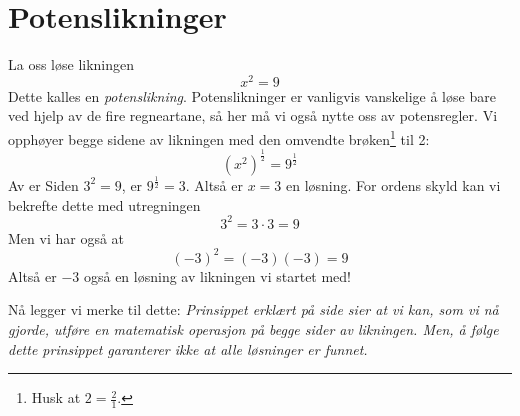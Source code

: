 \newpage
{}
\section{Potenslikninger}
La oss løse likningen
\[ x^2=9 \]
Dette kalles en \textit{potenslikning}. Potenslikninger er vanligvis vanskelige å løse bare ved hjelp av de fire regneartane, så her må vi også nytte oss av potensregler. Vi opphøyer begge sidene av likningen med den omvendte brøken\footnote{Husk at $ 2=\frac{2}{1} $.} til 2:
\[ \left(x^2\right)^\frac{1}{2}=9^\frac{1}{2} \]
Av  er
Siden $ 3^2=9 $, er $ 9^\frac{1}{2}=3 $. Altså er $ {x=3} $ en løsning. For ordens skyld kan vi bekrefte dette med utregningen
\[ 3^2=3\cdot3=9 \]
Men vi har også at
\[ (-3)^2=(-3)(-3)=9 \]
Altså er $ -3 $ også en løsning av likningen vi startet med! \vsk

Nå legger vi merke til dette: \textsl{Prinsippet erklært på side \pageref{principle} sier at vi kan, som vi nå gjorde, utføre en matematisk operasjon på begge sider av likningen. Men, å følge dette prinsippet garanterer ikke at alle løsninger er funnet.}\regv

